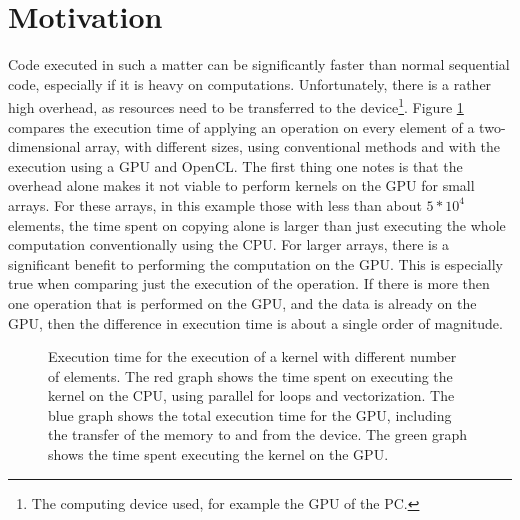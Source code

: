 \section{Motivation}
\label{sect:intro_motivation}

Code executed in such a matter can be significantly faster than normal sequential code, especially if it is heavy on computations. Unfortunately, there is a rather high overhead, as resources need to be transferred to the device\footnote{The computing device used, for example the GPU of the PC.}. Figure \ref{fig:intro_performance_cpu_gpu} compares the execution time of applying an operation on every element of a two-dimensional array, with different sizes, using conventional methods and with the execution using a GPU and OpenCL. The first thing one notes is that the overhead alone makes it not viable to perform kernels on the GPU for small arrays. For these arrays, in this example those with less than about $5*10^4$ elements, the time spent on copying alone is larger than just executing the whole computation conventionally using the CPU. For larger arrays, there is a significant benefit to performing the computation on the GPU. This is especially true when comparing just the execution of the operation. If there is more then one operation that is performed on the GPU, and the data is already on the GPU, then the difference in execution time is about a single order of magnitude.\\

\begin{figure}[h]
  \begin{center}
    \caption{Execution time for the execution of a kernel with different number of elements. The red graph shows the time spent on executing the kernel on the CPU, using parallel for loops and vectorization. The blue graph shows the total execution time for the GPU, including the transfer of the memory to and from the device. The green graph shows the time spent executing the kernel on the GPU.}
    \label{fig:intro_performance_cpu_gpu}
  \end{center}
\end{figure}

